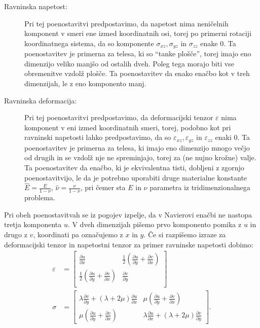 \documentclass[12pt,a4paper,twoside]{article}
\theoremstyle{definition} %
\theoremstyle{plain} %
\numberwithin{equation}{section}
\newcommand{\eps}{\varepsilon}
\newcommand{\dpar}[2]{\ensuremath{\frac{\partial #1}{\partial #2}}}
\newcommand{\ts}{\sigma}
\begin{document}
\begin{description}
  \item[Ravninska napetost:]
Pri tej poenostavitvi predpostavimo, da napetost nima neničelnih komponent v smeri ene izmed
koordinatnih osi, torej po primerni rotaciji koordinatnega sistema, da so komponente $\ts_{xz},
\ts_{yz}$ in $\ts_{zz}$ enake 0. Ta poenostavitev je primerna za telesa, ki so ``tanke plošče'',
torej imajo eno dimenzijo veliko manjšo od ostalih dveh. Poleg tega morajo biti vse obremenitve
vzdolž plošče. Ta poenostavitev da enako enačbo kot v treh dimenzijah, le z eno komponento manj.
  \item[Ravninska deformacija:]
Pri tej poenostavitvi predpostavimo, da deformacijski tenzor $\eps$ nima komponent v eni izmed
koordinatnih smeri, torej, podobno kot pri ravninski napetosti lahko predpostavimo, da so
$\eps_{xz}, \eps_{yz}$ in $\eps_{zz}$ enaki 0. Ta poenostavitev je primerna za telesa, ki imajo eno
dimenzijo mnogo večjo od drugih in se vzdolž nje ne spreminjajo, torej za (ne nujno krožne) valje.
Ta poenostavitev da enačbo, ki je ekvivalentna tisti, dobljeni z zgornjo poenostavitvijo,
le da je potrebno uporabiti druge materialne konstante $\hat{E} = \frac{E}{1 - \nu}$, $\hat\nu =
\frac{\nu}{1-\nu}$, pri čemer sta $E$ in $\nu$ parametra iz tridimenzionalnega problema.
\end{description}

Pri obeh poenostavitvah se iz pogojev izpelje, da v Navierovi enačbi ne nastopa
tretja komponenta $u$. V dveh dimenzijah
pišemo prvo komponento pomika z $u$ in drugo z $v$, koordinati pa označujemo z
$x$ in $y$. Če si razpišemo izraze za deformacijski tenzor in napetostni tenzor
za primer ravninske napetosti dobimo:
\begin{align*}
  \eps &=
  \begin{bmatrix}
    \dpar{u}{x} & \frac12(\dpar{u}{y} + \dpar{v}{x}) \\
    \frac12(\dpar{u}{y} + \dpar{v}{x}) & \dpar{v}{y} \\
  \end{bmatrix}
  \\
  \ts &=
  \begin{bmatrix}
    \lambda \dpar{v}{y} + (\lambda+2\mu) \dpar{u}{x} &
    \mu(\dpar{u}{y} + \dpar{v}{x}) \\
    \mu(\dpar{u}{y} + \dpar{v}{x}) &
    \lambda \dpar{u}{x} + (\lambda+2\mu) \dpar{v}{y}
  \end{bmatrix}.
  \\
\end{align*}
\end{document}

